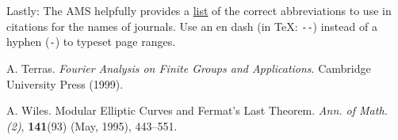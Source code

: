 \documentclass[a4paper,10pt,leqno]{amsart}
\numberwithin{equation}{section}
\theoremstyle{plain}
\theoremstyle{plain}
\theoremstyle{definition}
\theoremstyle{remark}
\begin{document}
Lastly:
The AMS helpfully provides a \href{https://mathscinet.ams.org/msnhtml/serials.pdf}{list} of the correct abbreviations to use in citations for the names of journals.
Use an en dash (in \TeX: \texttt{-{}-}) instead of a hyphen (\texttt{-}) to typeset page ranges.


\frenchspacing
\begin{thebibliography}{11}
	A. Terras.
	\textsl{Fourier Analysis on Finite Groups and Applications}.
	Cambridge University Press (1999).
	
	A. Wiles.
	Modular Elliptic Curves and Fermat's Last Theorem.
	\textsl{Ann. of Math. (2)},
	\textbf{141}(93)
	(May, 1995),
	443--551.

	
\end{thebibliography}
\end{document}
